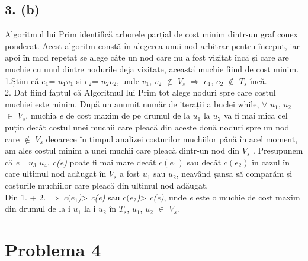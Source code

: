 \documentclass[12pt] {fphw}
\begin{document}
\subsection*{3. (b)} 
    Algoritmul lui Prim identifică arborele parțial de cost minim dintr-un graf conex ponderat. Acest algoritm constă în alegerea unui nod arbitrar pentru început, iar apoi în mod repetat se alege câte un nod care nu a fost vizitat încă și care are muchie cu unul dintre nodurile deja vizitate, această muchie fiind de cost minim. \\
    1.Știm că  \textit{ ${}e_{1}$}= \textit{  ${}u_{1}$${}v_{1}$} și  \textit{ ${}e_{2}$}= \textit{  ${}u_{2}$${}v_{2}$}, unde  \textit{ ${}v_{1}$}, \textit{ ${}v_{2}$} $\notin$  \textit{ ${}V_{s}$} $\Rightarrow$ \textit{ ${}e_{1}$}, \textit{ ${}e_{2}$} $\notin$  \textit{ ${}T_{s}$} încă. \\
    2. Dat fiind faptul că Algoritmul lui Prim tot alege noduri spre care costul muchiei este minim. După un anumit număr de iterații a buclei while, $\forall$ \textit{ ${}u_{1}$}, \textit{ ${}u_{2}$}  $\in$ \textit{ ${}V_{s}$}, muchia \textit{e} de cost maxim de pe drumul de la  \textit{ ${}u_{1}$} la \textit{ ${}u_{2}$} va fi mai mică cel puțin decât costul unei muchii care pleacă din aceste două noduri spre un nod care $\notin$  \textit{ ${}V_{s}$} deoarece în timpul analizei costurilor muchiilor până în acel moment, am ales costul minim a unei muchii care pleacă dintr-un nod din \textit{ ${}V_{s}$} . Presupunem că  \textit{e}=\textit{ ${}u_{3}$}\textit{ ${}u_{4}$}, \textit{c(e)} poate fi mai mare decât \textit{ ${}c(e_{1})$} sau decât  \textit{ ${}c(e_{2})$} în cazul în care ultimul nod adăugat în  \textit{ ${}V_{s}$} a fost  \textit{ ${}u_{1}$} sau  \textit{ ${}u_{2}$}, neavând șansa să comparăm și costurile muchiilor care pleacă din ultimul nod adăugat. \\
Din 1. + 2. $\Rightarrow$  \textit{ ${}c(e_{1}$)}> \textit{ c(e)} sau  \textit{ ${}c(e_{2}$)}> \textit{ c(e)}, unde  \textit{e} este o muchie de cost maxim din drumul de la i  \textit{ ${}u_{1}$} la i  \textit{ ${}u_{2}$} în \textit{ ${}T_{s}$},  \textit{ ${}u_{1}$}, \textit{ ${}u_{2}$} $\in$  \textit{ ${}V_{s}$}.

\section*{Problema 4}
\end{document}

